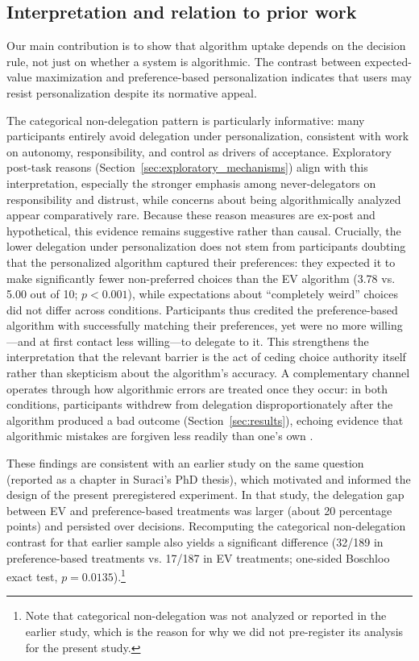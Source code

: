 \documentclass[a4paper, 12pt, fleqn]{article}
\theoremstyle{definition}
\begin{document}
\subsection{Interpretation and relation to prior work}
Our main contribution is to show that algorithm uptake depends on the decision rule, not just on whether a system is algorithmic. The contrast between expected-value maximization and preference-based personalization indicates that users may resist personalization despite its normative appeal.

The categorical non-delegation pattern is particularly informative: many participants entirely avoid delegation under personalization, consistent with work on autonomy, responsibility, and control as drivers of acceptance. Exploratory post-task reasons (Section~\ref{sec:exploratory_mechanisms}) align with this interpretation, especially the stronger emphasis among never-delegators on responsibility and distrust, while concerns about being algorithmically analyzed appear comparatively rare. Because these reason measures are ex-post and hypothetical, this evidence remains suggestive rather than causal. Crucially, the lower delegation under personalization does not stem from participants doubting that the personalized algorithm captured their preferences: they expected it to make significantly fewer non-preferred choices than the EV algorithm (3.78 vs. 5.00 out of 10; $p < 0.001$), while expectations about ``completely weird'' choices did not differ across conditions. Participants thus credited the preference-based algorithm with successfully matching their preferences, yet were no more willing---and at first contact less willing---to delegate to it. This strengthens the interpretation that the relevant barrier is the act of ceding choice authority itself rather than skepticism about the algorithm's accuracy. A complementary channel operates through how algorithmic errors are treated once they occur: in both conditions, participants withdrew from delegation disproportionately after the algorithm produced a bad outcome (Section~\ref{sec:results}), echoing evidence that algorithmic mistakes are forgiven less readily than one's own \citep{Dietvorst2018,Renier2021}.

These findings are consistent with an earlier study on the same question (reported as a chapter in Suraci's PhD thesis), which motivated and informed the design of the present preregistered experiment. In that study, the delegation gap between EV and preference-based treatments was larger (about 20 percentage points) and persisted over decisions. Recomputing the categorical non-delegation contrast for that earlier sample also yields a significant difference (32/189 in preference-based treatments vs. 17/187 in EV treatments; one-sided Boschloo exact test, $p = 0.0135$).\footnote{Note that categorical non-delegation was not analyzed or reported in the earlier study, which is the reason for why we did not pre-register its analysis for the present study.}
\end{document}
